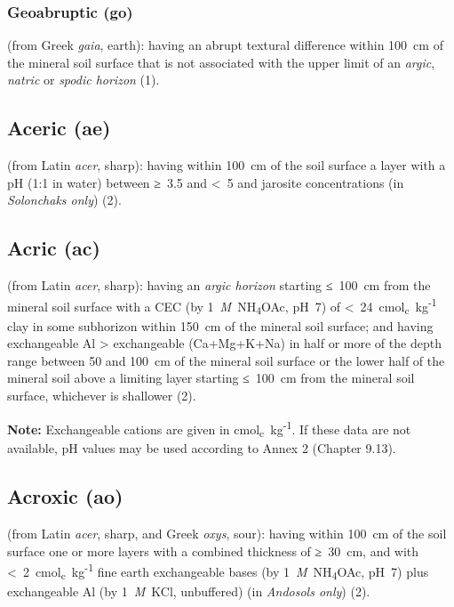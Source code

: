 \documentclass[
  letterpaper,
  DIV=11,
  numbers=noendperiod]{scrreprt}
\begin{document}
\hypertarget{geoabruptic-go}{%
\subsubsection{Geoabruptic (go)}\label{geoabruptic-go}}

(from Greek \emph{gaia}, earth): having an abrupt textural difference
within 100~cm of the mineral soil surface that is not associated with
the upper limit of an \emph{argic}, \emph{natric} or \emph{spodic
horizon} (1).

\hypertarget{aceric-ae}{%
\subsection{Aceric (ae)}\label{aceric-ae}}

(from Latin \emph{acer}, sharp): having within 100~cm of the soil
surface a layer with a pH (1:1 in water) between ≥~3.5 and \textless~5
and jarosite concentrations (in \emph{Solonchaks only}) (2).

\hypertarget{acric-ac}{%
\subsection{Acric (ac)}\label{acric-ac}}

(from Latin \emph{acer}, sharp): having an \emph{argic horizon} starting
≤~100~cm from the mineral soil surface with a CEC (by
1~\emph{M}~NH\textsubscript{4}OAc, pH~7) of
\textless~24~cmol\textsubscript{c}~kg\textsuperscript{-1} clay in some
subhorizon within 150~cm of the mineral soil surface; and having
exchangeable Al \textgreater{} exchangeable (Ca+Mg+K+Na) in half or more
of the depth range between 50 and 100~cm of the mineral soil surface or
the lower half of the mineral soil above a limiting layer starting
≤~100~cm from the mineral soil surface, whichever is shallower (2).

\textbf{Note:} Exchangeable cations are given in
cmol\textsubscript{c}~kg\textsuperscript{-1}. If these data are not
available, pH values may be used according to Annex 2 (Chapter 9.13).

\hypertarget{acroxic-ao}{%
\subsection{Acroxic (ao)}\label{acroxic-ao}}

(from Latin \emph{acer}, sharp, and Greek \emph{oxys}, sour): having
within 100~cm of the soil surface one or more layers with a combined
thickness of ≥~30~cm, and with
\textless~2~cmol\textsubscript{c}~kg\textsuperscript{-1} fine earth
exchangeable bases (by 1~\emph{M}~NH\textsubscript{4}OAc, pH~7) plus
exchangeable Al (by 1~\emph{M}~KCl, unbuffered) (in \emph{Andosols
only}) (2).
\end{document}
